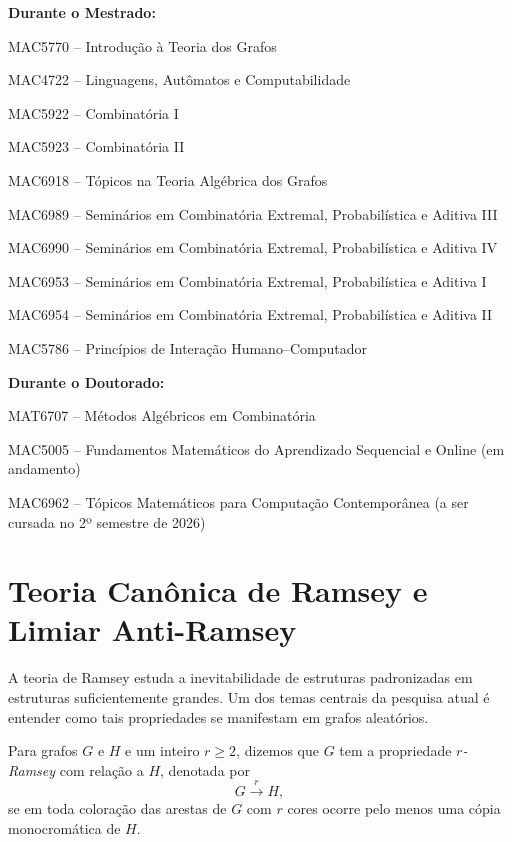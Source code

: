 \documentclass[reqno, 12pt]{amsart}
\newenvironment{packed_itemize}{
\begin{itemize}
  \setlength{\itemsep}{2pt}
  \setlength{\parskip}{0pt}
  \setlength{\parsep}{0pt}
}{\end{itemize}}
\numberwithin{equation}{section}
\theoremstyle{definition}
\theoremstyle{plain}
\begin{document}
\textbf{Durante o Mestrado:}
\begin{packed_itemize}
  \item MAC5770 -- Introdução à Teoria dos Grafos 
  \item MAC4722 -- Linguagens, Autômatos e Computabilidade 
    \item MAC5922 -- Combinatória I
  \item MAC5923 -- Combinatória II
  \item MAC6918 -- Tópicos na Teoria Algébrica dos Grafos
  \item MAC6989 -- Seminários em Combinatória Extremal, Probabilística e Aditiva III
  \item MAC6990 -- Seminários em Combinatória Extremal, Probabilística e Aditiva IV
  \item MAC6953 -- Seminários em Combinatória Extremal, Probabilística e Aditiva I
  \item MAC6954 -- Seminários em Combinatória Extremal, Probabilística e Aditiva II
    \item MAC5786 -- Princípios de Interação Humano--Computador
\end{packed_itemize}


\textbf{Durante o Doutorado:}
\begin{packed_itemize}
  \item MAT6707 -- Métodos Algébricos em Combinatória
  \item MAC5005 -- Fundamentos Matemáticos do Aprendizado Sequencial e Online (em andamento)
  \item MAC6962 -- Tópicos Matemáticos para Computação Contemporânea (a ser cursada no 2º semestre de 2026)
\end{packed_itemize}

\section{Teoria Canônica de Ramsey e Limiar Anti-Ramsey}

A teoria de Ramsey estuda a inevitabilidade de estruturas padronizadas em
estruturas suficientemente grandes. Um dos temas centrais da
pesquisa atual é entender como tais propriedades se manifestam em grafos
aleatórios.


Para grafos \(G\) e \(H\) e um inteiro \(r\ge 2\), dizemos que \(G\) tem a propriedade \emph{$r$-Ramsey} com relação a \(H\), denotada por
\[
G \xrightarrow{r} H,
\]
se em toda coloração das arestas de \(G\) com \(r\) cores ocorre pelo menos uma cópia monocromática de \(H\).
\end{document}
